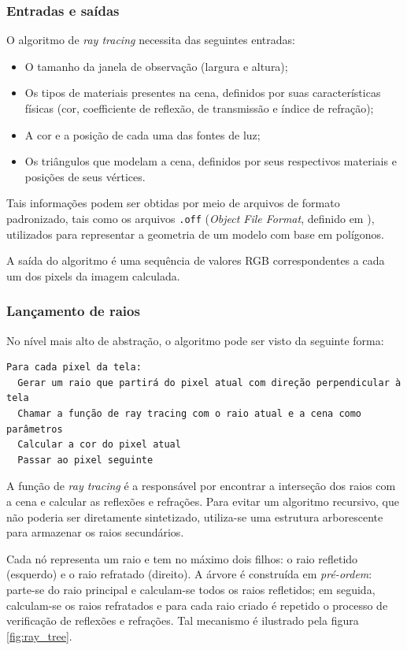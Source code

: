 \documentclass[a4paper,12pt]{article}
\newcommand\raytracing{\emph{ray tracing}}
\begin{document}
\subsubsection{Entradas e saídas}
O algoritmo de \raytracing{} necessita das seguintes entradas:

\begin{itemize}
\item O tamanho da janela de observação (largura e altura);
\item Os tipos de materiais presentes na cena, definidos por suas
  características físicas (cor, coefficiente de reflexão, de transmissão e
  índice de refração);
\item A cor e a posição de cada uma das fontes de luz;
\item Os triângulos que modelam a cena, definidos por seus respectivos materiais
  e posições de seus vértices.
\end{itemize}

Tais informações podem ser obtidas por meio de arquivos de formato padronizado,
tais como os arquivos \verb|.off| (\emph{Object File Format}, definido em
\cite{Shilane:2004:TPS}), utilizados para representar a geometria de um modelo
com base em polígonos.

A saída do algoritmo é uma sequência de valores RGB correspondentes a cada um
dos pixels da imagem calculada.

\subsubsection{Lançamento de raios}
No nível mais alto de abstração, o algoritmo pode ser visto da seguinte forma:

\begin{footnotesize}
\begin{verbatim}
Para cada pixel da tela:
  Gerar um raio que partirá do pixel atual com direção perpendicular à tela
  Chamar a função de ray tracing com o raio atual e a cena como parâmetros
  Calcular a cor do pixel atual
  Passar ao pixel seguinte
\end{verbatim}
\end{footnotesize}

A função de \raytracing{} é a responsável por encontrar a interseção dos
raios com a cena e calcular as reflexões e refrações. Para evitar um algoritmo
recursivo, que não poderia ser diretamente sintetizado, utiliza-se uma estrutura
arborescente para armazenar os raios secundários.

Cada nó representa um raio e tem no máximo dois filhos: o raio refletido
(esquerdo) e o raio refratado (direito). A árvore é construída em
\emph{pré-ordem}: parte-se do raio principal e calculam-se todos os
raios refletidos; em seguida, calculam-se os raios refratados e para cada raio
criado é repetido o processo de verificação de reflexões e refrações. Tal
mecanismo é ilustrado pela figura \ref{fig:ray_tree}.
\end{document}

